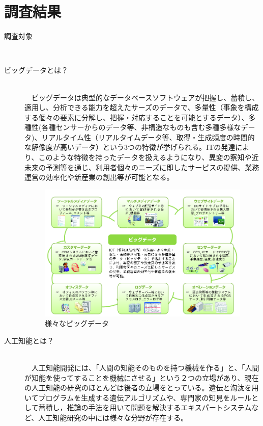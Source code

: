 \documentclass[a4paper,12pt]{jarticle}
\begin{document}
\section{調査結果}
\begin{description}
 \item[調査対象]\mbox\\\\
 \item[ビッグデータとは？]\mbox\\\\
　ビッグデータは典型的なデータベースソフトウェアが把握し、蓄積し、適用し、分析できる能力を超えたサーズのデータで、多量性（事象を構成する個々の要素に分解し、把握・対応することを可能とするデータ）、多種性(各種センサーからのデータ等、非構造なものも含む多種多様なデータ)、リアルタイム性（リアルタイムデータ等、取得・生成頻度の時間的な解像度が高いデータ）という3つの特徴が挙げられる。ITの発達により、このような特徴を持ったデータを扱えるようになり、異変の察知や近未来の予測等を通じ、利用者個々のニーズに即したサービスの提供、業務運営の効率化や新産業の創出等が可能となる。
  \begin{figure}[H]
   \begin{center}
    \includegraphics[width=150truemm]{BigData.png}
    \caption{様々なビッグデータ}
    \label{BigDataPicture}
   \end{center}
  \end{figure}
 \item[人工知能とは？]\mbox\\\\
　人工知能開発には、「人間の知能そのものを持つ機械を作る」と、「人間が知能を使ってすることを機械にさせる」という２つの立場があり、現在の人工知能の研究のほとんどは後者の立場をとっている。遺伝と淘汰を用いてプログラムを生成する遺伝アルゴリズムや、専門家の知見をルールとして蓄積し，推論の手法を用いて問題を解決するエキスパートシステムなど、人工知能研究の中には様々な分野が存在する。

\end{description}
\end{document}
